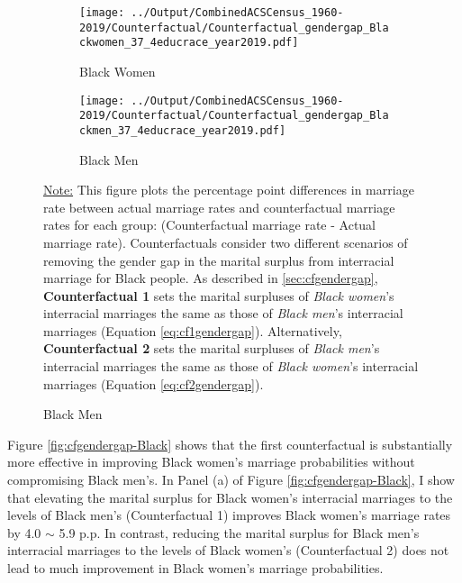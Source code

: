 \begin{figure}[H] \caption{Percentage Point Changes in Marriage Rates after Removing Gender Gap in $\mathbf{Z}^{interracial}$, Year 2019} \label{fig:cfgendergap-Black}

 \begin{subfigure}[b]{0.47\textwidth}
           \centering
         \texttt{[image: ../Output/CombinedACSCensus\_1960-2019/Counterfactual/Counterfactual\_gendergap\_Blackwomen\_37\_4educrace\_year2019.pdf]}
         \caption{Black Women} \label{fig:cf1-Blackwomen}
     \end{subfigure}
	  \hfill
	   \begin{subfigure}[b]{0.47\textwidth}
           \centering
         \texttt{[image: ../Output/CombinedACSCensus\_1960-2019/Counterfactual/Counterfactual\_gendergap\_Blackmen\_37\_4educrace\_year2019.pdf]}
         \caption{Black Men} \label{fig:cf2-Blackmen}
     \end{subfigure}
    \begin{fignote}
	\underline{Note:} This figure plots the percentage point differences in marriage rate between actual marriage rates and counterfactual marriage rates for each group: (Counterfactual marriage rate - Actual marriage rate). Counterfactuals consider two different scenarios of removing the gender gap in the marital surplus from interracial marriage for Black people. As described in \ref{sec:cfgendergap}, \textbf{Counterfactual 1} sets the marital surpluses of \textit{Black women}'s interracial marriages the same as those of \textit{Black men}'s interracial marriages (Equation \ref{eq:cf1gendergap}). Alternatively,  \textbf{Counterfactual 2} sets the marital surpluses of \textit{Black men}'s interracial marriages the same as those of \textit{Black women}'s interracial marriages (Equation \ref{eq:cf2gendergap}). 
\end{fignote}
	
\end{figure}


Figure \ref{fig:cfgendergap-Black} shows that the first counterfactual is substantially more effective in improving Black women's marriage probabilities without compromising Black men's. In Panel (a) of Figure \ref{fig:cfgendergap-Black}, I show that elevating the marital surplus for Black women's interracial marriages to the levels of Black men's (Counterfactual 1) improves Black women's marriage rates by 4.0 $\sim$ 5.9 p.p. In contrast,  reducing the marital surplus for Black men's interracial marriages to the levels of Black women's (Counterfactual 2) does not lead to much improvement in Black women's marriage probabilities. 


